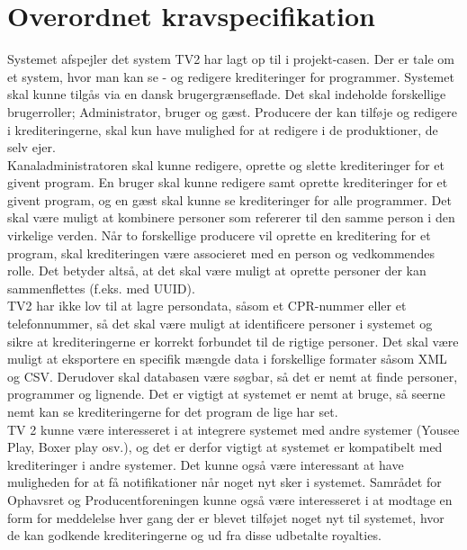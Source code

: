 \section{Overordnet kravspecifikation}
Systemet afspejler det system TV2 har lagt op til i projekt-casen. Der er tale om et system, hvor man kan se - og redigere krediteringer for programmer. Systemet skal kunne tilgås via en dansk brugergrænseflade. Det skal indeholde forskellige brugerroller; Administrator, bruger og gæst. Producere der kan tilføje og redigere i krediteringerne, skal kun have mulighed for at redigere i de produktioner, de selv ejer.\\

Kanaladministratoren skal kunne redigere, oprette og slette krediteringer for et givent program. En bruger skal kunne redigere samt oprette krediteringer for et givent program, og en gæst skal kunne se krediteringer for alle programmer. Det skal være muligt at kombinere personer som refererer til den samme person i den virkelige verden. Når to forskellige producere vil oprette en kreditering for et program, skal krediteringen være associeret med en person og vedkommendes rolle. Det betyder altså, at det skal være muligt at oprette personer der kan sammenflettes (f.eks. med UUID).\\

TV2 har ikke lov til at lagre persondata, såsom et CPR-nummer eller et telefonnummer, så det skal være muligt at identificere personer i systemet og sikre at krediteringerne er korrekt forbundet til de rigtige personer.
Det skal være muligt at eksportere en specifik mængde data i forskellige formater såsom XML og CSV. Derudover skal databasen være søgbar, så det er nemt at finde personer, programmer og lignende. Det er vigtigt at systemet er nemt at bruge, så seerne nemt kan se krediteringerne for det program de lige har set.\\

TV 2 kunne være interesseret i at integrere systemet med andre systemer (Yousee Play, Boxer play osv.), og det er derfor vigtigt at systemet er kompatibelt med krediteringer i andre systemer. Det kunne også være interessant at have muligheden for at få notifikationer når noget nyt sker i systemet. Samrådet for Ophavsret og Producentforeningen kunne også være interesseret i at modtage en form for meddelelse hver gang der er blevet tilføjet noget nyt til systemet, hvor de kan godkende krediteringerne og ud fra disse udbetalte royalties.\\

